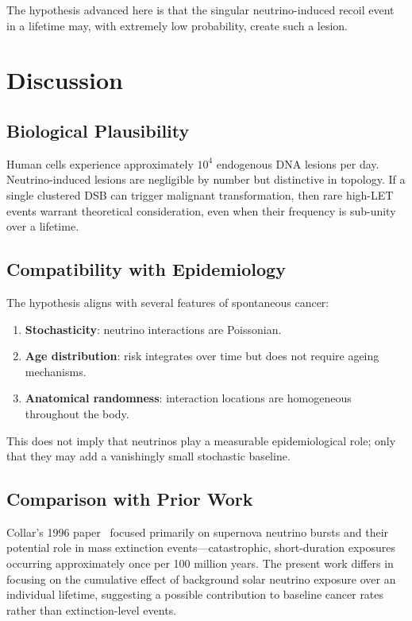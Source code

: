 \documentclass[12pt,a4paper]{article}
\begin{document}
The hypothesis advanced here is that the singular neutrino-induced recoil event in a lifetime may, with extremely low probability, create such a lesion.

\section{Discussion}

\subsection{Biological Plausibility}

Human cells experience approximately $10^{4}$ endogenous DNA lesions per day. Neutrino-induced lesions are negligible by number but distinctive in topology. If a single clustered DSB can trigger malignant transformation, then rare high-LET events warrant theoretical consideration, even when their frequency is sub-unity over a lifetime.

\subsection{Compatibility with Epidemiology}

The hypothesis aligns with several features of spontaneous cancer:

\begin{enumerate}
\item \textbf{Stochasticity}: neutrino interactions are Poissonian.  
\item \textbf{Age distribution}: risk integrates over time but does not require ageing mechanisms.  
\item \textbf{Anatomical randomness}: interaction locations are homogeneous throughout the body.  
\end{enumerate}

This does not imply that neutrinos play a measurable epidemiological role; only that they may add a vanishingly small stochastic baseline.

\subsection{Comparison with Prior Work}

Collar's 1996 paper~\cite{collar1996} focused primarily on supernova neutrino bursts and their potential role in mass extinction events---catastrophic, short-duration exposures occurring approximately once per 100 million years. The present work differs in focusing on the cumulative effect of background solar neutrino exposure over an individual lifetime, suggesting a possible contribution to baseline cancer rates rather than extinction-level events.
\end{document}
